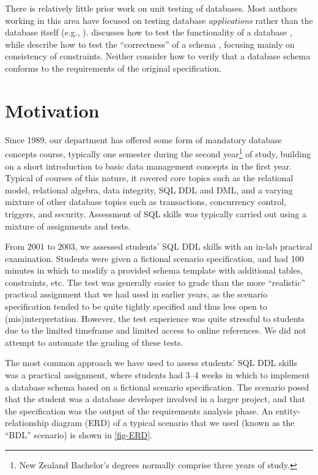 \documentclass[sigconf, authordraft, capitalise]{acmart}
\begin{document}
There is relatively little prior work on unit testing of databases. Most authors working in this area have focused on testing database \emph{applications} rather than the database itself (e.g., \cite{Binnig.C-2008a-Multi-RQP,Chays.D-2008a-Query-based,Marcozzi.M-2012a-Test,Haller.K-2010a-Test}). \citeauthor{Ambler.S-2006a-Database} discusses how to test the functionality of a database \cite{Ambler.S-2006a-Database}, while \citeauthor{Farre.C-2008a-SVTe} describe how to test the ``correctness'' of a schema \cite{Farre.C-2008a-SVTe}, focusing mainly on consistency of constraints. Neither consider how to verify that a database schema conforms to the requirements of the original specification.


\section{Motivation}
\label{sec-motivation}

Since 1989, our department has offered some form of mandatory database concepts course, typically one semester during the second year\footnote{New Zealand Bachelor's degrees normally comprise three years of study.} of study, building on a short introduction to basic data management concepts in the first year. Typical of courses of this nature, it covered core topics such as the relational model, relational algebra, data integrity, SQL DDL and DML, and a varying mixture of other database topics such as transactions, concurrency control, triggers, and security. Assessment of SQL skills was typically carried out using a mixture of assignments and tests.

From 2001 to 2003, we assessed students' SQL DDL skills with an in-lab practical examination. Students were given a fictional scenario specification, and had 100 minutes in which to modify a provided schema template with additional tables, constraints, etc. The test was generally easier to grade than the more ``realistic'' practical assignment that we had used in earlier years, as the scenario specification tended to be quite tightly specified and thus less open to (mis)interpretation. However, the test experience was quite stressful to students due to the limited timeframe and limited access to online references. We did not attempt to automate the grading of these tests.

The most common approach we have used to assess students' SQL DDL skills was a practical assignment, where students had 3--4 weeks in which to implement a database schema based on a fictional scenario specification. The scenario posed that the student was a database developer involved in a larger project, and that the specification was the output of the requirements analysis phase. An entity-relationship diagram (ERD) of a typical scenario that we used (known as the ``BDL'' scenario) is shown in \cref{fig-ERD}.
 
\end{document}
